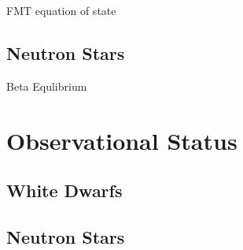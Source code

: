 FMT equation of state

\subsection{Neutron Stars}


Beta Equlibrium
\section{Observational Status}

\subsection{White Dwarfs}

\subsection{Neutron Stars}

